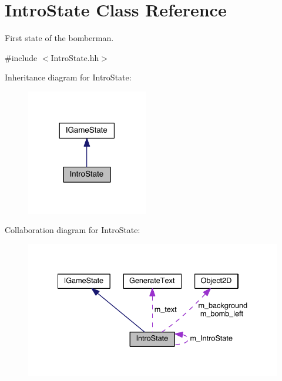 \hypertarget{class_intro_state}{}\section{Intro\+State Class Reference}
\label{class_intro_state}


First state of the bomberman.  




{\ttfamily \#include $<$Intro\+State.\+hh$>$}



Inheritance diagram for Intro\+State\+:\nopagebreak
\begin{figure}[H]
\begin{center}
\leavevmode
\includegraphics[width=150pt]{class_intro_state__inherit__graph}
\end{center}
\end{figure}


Collaboration diagram for Intro\+State\+:\nopagebreak
\begin{figure}[H]
\begin{center}
\leavevmode
\includegraphics[width=335pt]{class_intro_state__coll__graph}
\end{center}
\end{figure}
